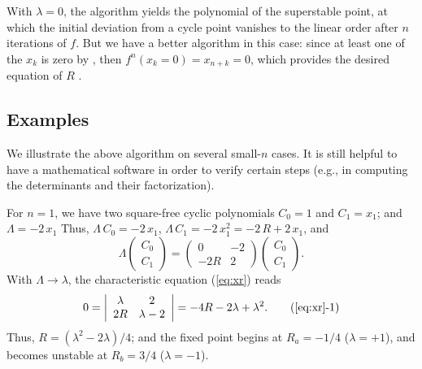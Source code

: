 \documentclass{ws-ijbc}
\begin{document}
\begin{remark}
  With $\lambda = 0$,
  the algorithm yields the polynomial of the superstable point,
  at which the initial deviation from a cycle point vanishes
  to the linear order after $n$ iterations of $f$.
  But we have a better algorithm in this case:
  since at least one of the $x_k$ is zero by ,
  then $f^n(x_k = 0) = x_{n+k} = 0$, which provides
  the desired equation of $R$ \cite{strogatz}.
\end{remark}





\subsection{\label{sec:examples}Examples}




We illustrate the above algorithm on several small-$n$ cases.
%
It is still helpful to have a mathematical software
  in order to verify certain steps
  (e.g., in computing the determinants and their factorization).



For $n = 1$, we have two square-free cyclic polynomials
  $C_0 = 1$ and $C_1 = x_1$;
  and $\Lambda = -2 \, x_1$
Thus,
$\Lambda \, C_0 = -2 \, x_1$,
$\Lambda \, C_1 = -2 \, x_1^2 = -2 \, R + 2  \, x_1$,
and
\[
  \Lambda
  \left( \begin{array}{c}
  C_0 \\
  C_1
  \end{array} \right)
  =
  \left( \begin{array}{cc}
  0     & -2 \\
  -2R   &  2
  \end{array}\right)
  \left( \begin{array}{c}
  C_0 \\
  C_1
  \end{array} \right).
\]
With $\Lambda \rightarrow \lambda$, the characteristic equation (\ref{eq:xr}) reads
\begin{equation}
0=  \left| \begin{array}{cc}
  \lambda     & 2          \\
  2 R         & \lambda - 2
  \end{array} \right| = -4R - 2\lambda + \lambda^2.
  \tag{\ref{eq:xr}-1}
\label{eq:xr1}
\end{equation}
Thus, $R = (\lambda^2 -2\lambda)/4$;
  and the fixed point begins at $R_a = -1/4$ ($\lambda = +1$),
  and becomes unstable at $R_b = 3/4$ ($\lambda = -1$).
\end{document}
